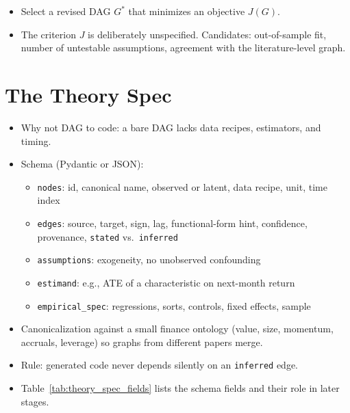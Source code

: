   \begin{itemize}
  \tightlist
  \item
    Select a revised DAG \(G^{*}\) that minimizes an objective \(J(G)\).
  \item
    The criterion \(J\) is deliberately unspecified. Candidates:
    out-of-sample fit, number of untestable assumptions, agreement with
    the literature-level graph.
  \end{itemize}


  \section{The Theory Spec}\label{sec:theory_spec}

  \begin{itemize}
  \tightlist
  \item
    Why not DAG to code: a bare DAG lacks data recipes, estimators, and
    timing.
  \item
    Schema (Pydantic or JSON):

    \begin{itemize}
    \tightlist
    \item
      \texttt{nodes}: id, canonical name, observed or latent, data recipe,
      unit, time index
    \item
      \texttt{edges}: source, target, sign, lag, functional-form hint,
      confidence, provenance, \texttt{stated} vs.~\texttt{inferred}
    \item
      \texttt{assumptions}: exogeneity, no unobserved confounding
    \item
      \texttt{estimand}: e.g., ATE of a characteristic on next-month
      return
    \item
      \texttt{empirical\_spec}: regressions, sorts, controls, fixed
      effects, sample
    \end{itemize}
  \item
    Canonicalization against a small finance ontology (value, size,
    momentum, accruals, leverage) so graphs from different papers merge.
  \item
    Rule: generated code never depends silently on an \texttt{inferred}
    edge.
  \item
    Table~\ref{tab:theory_spec_fields} lists the schema fields and their role in later stages.
  \end{itemize}

